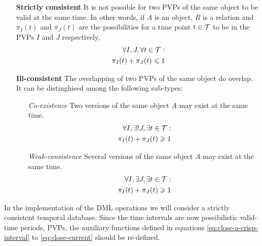 \begin{itemize}
\item [\textbf{Strictly consistent}] It is not possible for two PVPs of the same object to be valid at the same time. In other words, if $A$ is an object, $R$ is a relation and $\pi_{I}\left(t \right)$ and $\pi_{J}\left(t \right)$ are the possibilities for a time point $t \in \mathcal{T}$ to be in the PVPs $I$ and $J$ respectively,
\begin{align}
\label{eq:stricly-consistent}
\forall I,J, \forall t \in \mathcal{T} :\\
\nonumber
\pi_{I}(t) + \pi_{J}(t) \leqslant 1
\end{align}

\item [\textbf{Ill-consistent}] The overlapping of two PVPs of the same object do overlap. It can be distinghised among the following sub-types:
	\begin{itemize}
	\item [\emph{Co-existence}] Two versions of the same object $A$ may exist at the same time.
	\begin{align}
	\label{eq:co-existence}
	\forall I, \exists ! J, \exists t \in \mathcal{T} : \\
	\nonumber
	\pi_{I}(t) + \pi_{J}(t) \geqslant 1
	\end{align}
	\item [\emph{Weak-consistence}] Several versions of the same object $A$ may exist at the same time.
	\begin{align}
	\label{eq:weak-consistence}
	\forall I, \exists J, \exists t \in \mathcal{T} : \\
	\nonumber
	\pi_{I}(t) + \pi_{J}(t) \geqslant 1
	\end{align}
	\end{itemize}
\end{itemize}

In the implementation of the DML operations we will consider a strictly consistent temporal database. Since the time intervals are now possibilistic valid-time periods, PVPs, the auxiliary functions defined in equations \eqref{eq:close-a-crisp-interval} to \eqref{eq:close-current} should be re-defined.

